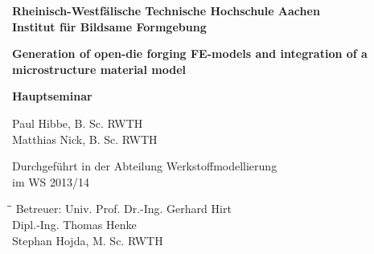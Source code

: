 %


\thispagestyle{empty} %

\begin{titlepage}     %

	\sffamily
	\begin{center}
		\vspace{1cm}
		
		\large{\textbf{Rheinisch-Westfälische Technische Hochschule Aachen\\Institut für Bildsame Formgebung}}
		
		\vspace{20mm}
				
		\Large{\textbf{Generation of open-die forging FE-models and integration of a microstructure material model\\}}
		
		\vspace{2cm}
		

		
		\LARGE{\textbf{Hauptseminar}} \\
		
		\vspace{1.5cm}
		
		\large{Paul Hibbe, B. Sc. RWTH\\ Matthias Nick, B. Sc. RWTH}\\
		
		\vspace{3cm}
		\end{center}
		

	
\begin{center}
\large{Durchgeführt in der Abteilung Werkstoffmodellierung \\ im WS 2013/14}
\end{center}

\vspace{3cm}
\begin{tabbing}
\hspace*{3cm}\=\hspace{2cm}\=\kill
Betreuer: \>Univ. Prof. Dr.-Ing. Gerhard Hirt\\
          \>Dipl.-Ing. Thomas Henke\\
          \>Stephan Hojda, M. Sc. RWTH
\end{tabbing}
\end{titlepage} %
